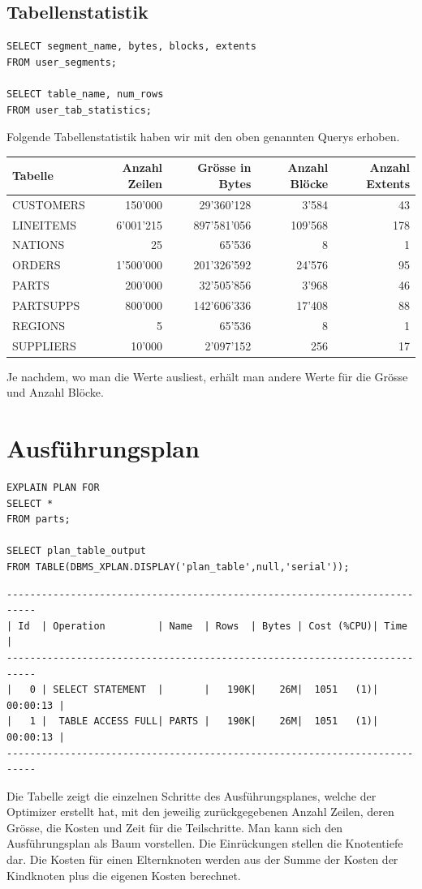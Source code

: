 \documentclass[10pt]{article}
\begin{document}
\subsection{Tabellenstatistik}
\begin{lstlisting}[style=sql]
SELECT segment_name, bytes, blocks, extents
FROM user_segments;

SELECT table_name, num_rows
FROM user_tab_statistics;
\end{lstlisting}
Folgende Tabellenstatistik haben wir mit den oben genannten Querys erhoben.
\begin{tabular}{l||r|r|r|r}
  Tabelle & Anzahl Zeilen & Grösse in Bytes & Anzahl Blöcke & Anzahl Extents \\ \hline
  \hline
  CUSTOMERS & 150'000 & 29'360'128 & 3'584 & 43 \\ \hline
  LINEITEMS & 6'001'215 & 897'581'056 & 109'568 & 178 \\ \hline
  NATIONS & 25 & 65'536 & 8 & 1 \\ \hline
  ORDERS & 1'500'000 & 201'326'592 & 24'576 & 95 \\ \hline
  PARTS & 200'000 & 32'505'856 & 3'968 & 46 \\ \hline
  PARTSUPPS & 800'000 & 142'606'336 & 17'408 & 88 \\ \hline
  REGIONS & 5 & 65'536 & 8 & 1 \\ \hline
  SUPPLIERS & 10'000 & 2'097'152 & 256 & 17 \\
\end{tabular}	
Je nachdem, wo man die Werte ausliest, erhält man andere Werte für die Grösse und 
Anzahl Blöcke.
\section{Ausführungsplan}
\begin{lstlisting}[style=sql]
EXPLAIN PLAN FOR
SELECT *
FROM parts;

SELECT plan_table_output
FROM TABLE(DBMS_XPLAN.DISPLAY('plan_table',null,'serial'));
\end{lstlisting}
\begin{lstlisting}[style=queryexecutionplan]
---------------------------------------------------------------------------
| Id  | Operation         | Name  | Rows  | Bytes | Cost (%CPU)| Time     |
---------------------------------------------------------------------------
|   0 | SELECT STATEMENT  |       |   190K|    26M|  1051   (1)| 00:00:13 |
|   1 |  TABLE ACCESS FULL| PARTS |   190K|    26M|  1051   (1)| 00:00:13 |
---------------------------------------------------------------------------
\end{lstlisting}
Die Tabelle zeigt die einzelnen Schritte des Ausführungsplanes, welche der 
Optimizer erstellt hat, mit den jeweilig zurückgegebenen Anzahl Zeilen, deren 
Grösse, die Kosten und Zeit für die Teilschritte. Man kann sich den 
Ausführungsplan als Baum vorstellen. Die Einrückungen stellen die Knotentiefe 
dar. Die Kosten für einen Elternknoten werden aus der Summe der Kosten der 
Kindknoten plus die eigenen Kosten berechnet.
\end{document}
